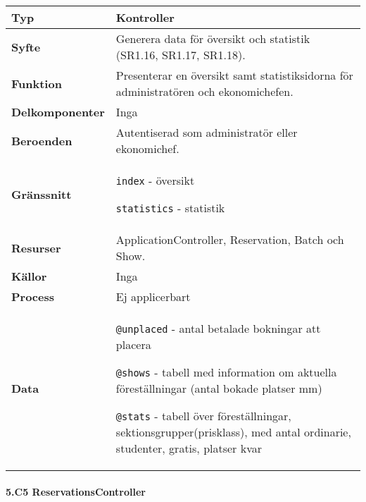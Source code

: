 \documentclass[a4paper, twoside, 11pt, titlepage]{article}
\begin{document}
			\begin {table} [ht] \begin{tabular} {  p{3.5cm} p{11.6cm} }
				\hline
				{\sffamily\textbf{Typ}} & {Kontroller} \\
				\hline
				{\sffamily\textbf{Syfte}} & {Generera data för översikt och statistik (SR1.16, SR1.17, SR1.18).} \\
				\hline
				{\sffamily\textbf{Funktion}} & {Presenterar en översikt samt statistiksidorna för administratören och ekonomichefen.} \\
				\hline
				{\sffamily\textbf{Delkomponenter}} & {Inga} \\
				\hline
				{\sffamily\textbf{Beroenden}} & {Autentiserad som administratör eller ekonomichef.} \\
				\hline
				{\sffamily\textbf{Gränssnitt}} & {{\tt index} - översikt

{\tt statistics} - statistik} \\
				\hline
				{\sffamily\textbf{Resurser}} & {ApplicationController, Reservation, Batch och Show.} \\
				\hline
				{\sffamily\textbf{Källor}} & {Inga} \\
				\hline
				{\sffamily\textbf{Process}} & {Ej applicerbart} \\
				\hline
				{\sffamily\textbf{Data}} & {{\tt @unplaced} - antal betalade bokningar att placera

{\tt @shows} - tabell med information om aktuella föreställningar (antal bokade platser mm)

{\tt @stats} - tabell över föreställningar, sektionsgrupper(prisklass), med antal ordinarie, studenter, gratis, platser kvar} \\
				\hline
			\end{tabular} \end{table} \FloatBarrier


			\paragraph{5.C5 ReservationsController}\
\end{document}
